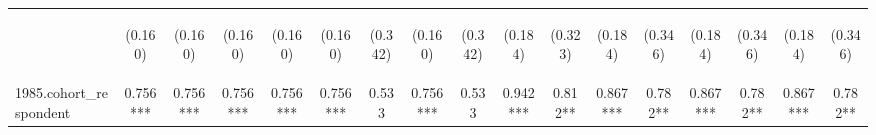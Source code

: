 \begin{center}
\begin{tabular}{lcccccccccccccccc}
\vspace{4pt} & \begin{footnotesize}(0.160)\end{footnotesize} & \begin{footnotesize}(0.160)\end{footnotesize} & \begin{footnotesize}(0.160)\end{footnotesize} & \begin{footnotesize}(0.160)\end{footnotesize} & \begin{footnotesize}(0.160)\end{footnotesize} & \begin{footnotesize}(0.342)\end{footnotesize} & \begin{footnotesize}(0.160)\end{footnotesize} & \begin{footnotesize}(0.342)\end{footnotesize} & \begin{footnotesize}(0.184)\end{footnotesize} & \begin{footnotesize}(0.323)\end{footnotesize} & \begin{footnotesize}(0.184)\end{footnotesize} & \begin{footnotesize}(0.346)\end{footnotesize} & \begin{footnotesize}(0.184)\end{footnotesize} & \begin{footnotesize}(0.346)\end{footnotesize} & \begin{footnotesize}(0.184)\end{footnotesize} & \begin{footnotesize}(0.346)\end{footnotesize} \\
1985.cohort\_respondent & 0.756*** & 0.756*** & 0.756*** & 0.756*** & 0.756*** & 0.533 & 0.756*** & 0.533 & 0.942*** & 0.812** & 0.867*** & 0.782** & 0.867*** & 0.782** & 0.867*** & 0.782** \\

\end{tabular}
\end{center}
